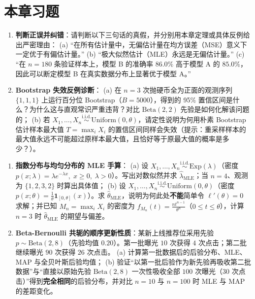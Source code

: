 \section{本章习题}
\label{sec:ch5-exercises}

\begin{enumerate}[label=\textbf{5.\arabic*}]
  \item \textbf{判断正误并纠错}：请判断以下三句话的真假，并分别用本章定理或具体反例给出严密理由：
  (a) “在所有估计量中，无偏估计量在均方误差（MSE）意义下一定优于有偏估计量。”
  (b) “极大似然估计（MLE）永远是无偏估计量。”
  (c) “在 $n=180$ 条验证样本上，模型 B 的准确率 $86.0\%$ 高于模型 A 的 $85.0\%$，因此可以断定模型 B 在真实数据分布上显著优于模型 A。”

  \item \textbf{Bootstrap 失效反例诊断}：
  (a) 在 $n=3$ 次抛硬币全为正面的观测序列 $\{1, 1, 1\}$ 上运行百分位 Bootstrap（$B=5000$），得到的 95\% 置信区间是什么？为什么这与直观常识严重违背？对比 $\mathrm{Beta}(2,2)$ 先验是如何化解该问题的；
  (b) 若 $X_1, \dots, X_n \stackrel{\text{i.i.d.}}{\sim} \mathrm{Uniform}(0, \theta)$，请定性说明为何用朴素 Bootstrap 估计样本最大值 $T = \max_i X_i$ 的置信区间同样会失效（提示：重采样样本的最大值永远不可能超过原样本最大值，且恰好等于原最大值的概率是多少？）。
\end{enumerate}

\begin{enumerate}[label=\textbf{5.\arabic*}, resume]
  \item \textbf{指数分布与均匀分布的 MLE 手算}：
  (a) 设 $X_1, \dots, X_n \stackrel{\text{i.i.d.}}{\sim} \mathrm{Exp}(\lambda)$（密度 $p(x; \lambda) = \lambda e^{-\lambda x},\; x \ge 0,\; \lambda > 0$）。写出对数似然并求 $\hat{\lambda}_{\text{MLE}}$；当 $n=4$、观测为 $\{1, 2, 3, 2\}$ 时算出具体值；
  (b) 设 $X_1, \dots, X_n \stackrel{\text{i.i.d.}}{\sim} \mathrm{Uniform}(0, \theta)$（密度 $p(x;\theta) = \frac{1}{\theta}\mathbf{1}_{[0,\theta]}(x)$）。求 $\hat{\theta}_{\text{MLE}}$，说明为何此处\textbf{不能}简单令 $\ell'(\theta)=0$ 求解；并已知 $M_n = \max_i X_i$ 的密度为 $f_{M_n}(t) = \frac{n t^{n-1}}{\theta^n}$（$0\le t\le\theta$），计算 $n=3$ 时 $\hat{\theta}_{\text{MLE}}$ 的期望与偏差。

  \item \textbf{Beta-Bernoulli 共轭的顺序更新性质}：某新上线推荐位采用先验 $p \sim \mathrm{Beta}(2, 8)$（先验均值 $0.20$）。第一批曝光 $10$ 次获得 $4$ 次点击；第二批继续曝光 $90$ 次获得 $26$ 次点击。
  (a) 计算第一批数据后的后验分布、MLE、MAP 与全贝叶斯后验均值；
  (b) 验证“以第一批后验作为新先验再吸收第二批数据”与“直接以原始先验 $\mathrm{Beta}(2,8)$ 一次性吸收全部 $100$ 次曝光（$30$ 次点击）”得到\textbf{完全相同}的后验分布，并对比 $n=10$ 与 $n=100$ 时 MLE 与 MAP 的差距变化。
\end{enumerate}

